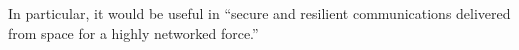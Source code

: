 \documentclass{article}
\begin{document}
In particular, it would be useful in ``secure and resilient communications delivered from space for a highly networked force.''
%
%
%
%
%
\end{document}
